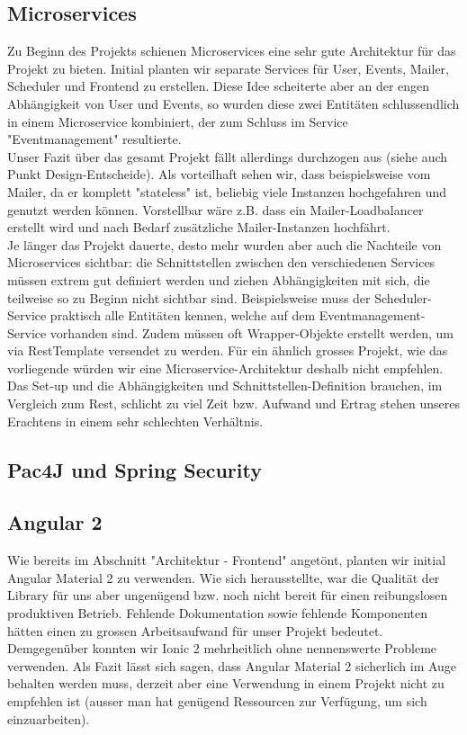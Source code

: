 \documentclass[11pt]{article} %
\begin{document}
\subsection{Microservices}
Zu Beginn des Projekts schienen Microservices eine sehr gute Architektur für das Projekt zu bieten. Initial planten wir separate Services für User, Events, Mailer, Scheduler und Frontend zu erstellen. Diese Idee scheiterte aber an der engen Abhängigkeit von User und Events, so wurden diese zwei Entitäten schlussendlich in einem Microservice kombiniert, der zum Schluss im Service "Eventmanagement" resultierte.
\\
Unser Fazit über das gesamt Projekt fällt allerdings durchzogen aus (siehe auch Punkt Design-Entscheide). Als vorteilhaft sehen wir, dass beispielsweise vom Mailer, da er komplett "stateless" ist, beliebig viele Instanzen hochgefahren und genutzt werden können. Vorstellbar wäre z.B. dass ein Mailer-Loadbalancer erstellt wird und nach Bedarf zusätzliche Mailer-Instanzen hochfährt.
\\
Je länger das Projekt dauerte, desto mehr wurden aber auch die Nachteile von Microservices sichtbar: die Schnittstellen zwischen den verschiedenen Services müssen extrem gut definiert werden und ziehen Abhängigkeiten mit sich, die teilweise so zu Beginn nicht sichtbar sind. Beispielsweise muss der Scheduler-Service praktisch alle Entitäten kennen, welche auf dem Eventmanagement-Service vorhanden sind. Zudem müssen oft Wrapper-Objekte erstellt werden, um via RestTemplate versendet zu werden. Für ein ähnlich grosses Projekt, wie das vorliegende würden wir eine Microservice-Architektur deshalb nicht empfehlen. Das Set-up und die Abhängigkeiten und Schnittstellen-Definition brauchen, im Vergleich zum Rest, schlicht zu viel Zeit bzw. Aufwand und Ertrag stehen unseres Erachtens in einem sehr schlechten Verhältnis.
\subsection{Pac4J und Spring Security}

\subsection{Angular 2}
Wie bereits im Abschnitt "Architektur - Frontend" angetönt, planten wir initial Angular Material 2 zu verwenden. Wie sich herausstellte, war die Qualität der Library für uns aber ungenügend bzw. noch nicht bereit für einen reibungslosen produktiven Betrieb. Fehlende Dokumentation sowie fehlende Komponenten hätten einen zu grossen Arbeitsaufwand für unser Projekt bedeutet. Demgegenüber konnten wir Ionic 2 mehrheitlich ohne nennenswerte Probleme verwenden. Als Fazit lässt sich sagen, dass Angular Material 2 sicherlich im Auge behalten werden muss, derzeit aber eine Verwendung in einem Projekt nicht zu empfehlen ist (ausser man hat genügend Ressourcen zur Verfügung, um sich einzuarbeiten).
\end{document}
